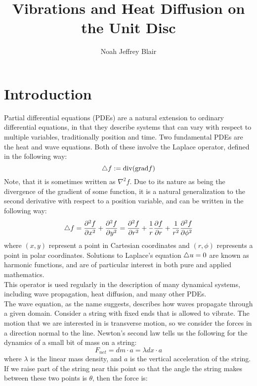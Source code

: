 \documentclass{paper}
\author{Noah Jeffrey Blair}
\title{Vibrations and Heat Diffusion on the Unit Disc}
\begin{document}
\maketitle
\tableofcontents
\begin{abstract}

\end{abstract}
\section{Introduction}
Partial differential equations (PDEs) are a natural extension to  ordinary differential equations, in that they describe systems that can vary with respect to multiple variables, traditionally position and time. Two fundamental PDEs are the heat and wave equations. Both of these involve the Laplace operator, defined in the following way:
\begin{equation}
  \bigtriangleup f := \mathrm{div}(\mathrm{grad} f)
\end{equation}
Note, that it is sometimes written as $\nabla^2 f$. Due to its nature as being the divergence of the gradient of some function, it is a natural generalization to the second derivative with respect to a position variable, and can be written in the following way:
\begin{equation}
  \bigtriangleup f = \frac{\partial ^2 f}{\partial x^2}+\frac{\partial ^2 f}{\partial y^2}= \frac{\partial ^2 f}{\partial r^2}+\frac{1}{r}\frac{\partial f}{\partial r}+\frac{1}{r^2}\frac{\partial ^2 f}{\partial \phi^2}
\end{equation}
where $(x,y)$ represent a point in Cartesian coordinates and $(r,\phi)$ represents a point in polar coordinates. Solutions to Laplace's equation $\bigtriangleup u = 0$ are known as harmonic functions, and are of particular interest in both pure and applied mathematics.\\
This operator is used regularly in the description of many dynamical systems, including wave propagation, heat diffusion, and many other PDEs.\\
The wave equation, as the name suggests, describes how waves propagate through a given domain. Consider a string with fixed ends that is allowed to vibrate. The motion that we are interested in is transverse motion, so we consider the forces in a direction normal to the line. Newton's second law tells us the following for the dynamics of a small bit of mass on a string:
\begin{equation}
    F_{net}=dm\cdot a=\lambda dx \cdot a
\end{equation}
where $\lambda$ is the linear mass density, and $a$ is the vertical acceleration of the string. If we raise part of the string near this point so that the angle the string makes between these two points is $\theta$, then the force is:
\end{document}
